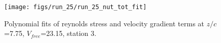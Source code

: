 \begin{figure}[H]
\centering
\texttt{[image: figs/run\_25/run\_25\_nut\_tot\_fit]}
\caption{Polynomial fits of reynolds stress and velocity gradient terms at $z/c$=7.75, $V_{free}$=23.15, station 3.}
\label{fig:run_25_nut_tot_fit}
\end{figure}


